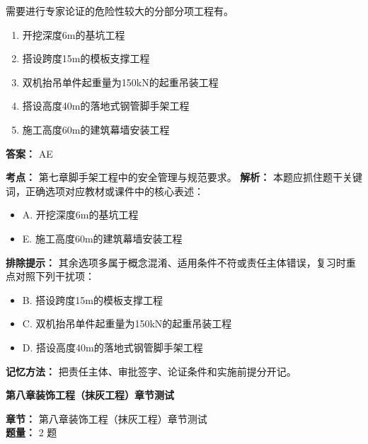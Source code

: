 \documentclass[UTF8,fontset=fandol,11pt]{ctexart}
\newcommand{\chaptertitle}[1]{\vspace{0.5em}\begin{tcolorbox}[enhanced,colback=deepblue,colframe=deepblue,arc=2mm,boxrule=0pt]\begin{center}\Large\bfseries\color{white}#1\end{center}\end{tcolorbox}\vspace{0.5em}}
\begin{document}
\begin{quizbox}[title={第 10 题}]
需要进行专家论证的危险性较大的分部分项工程有。\\
\begin{enumerate}[label=\Alph*.]
\item 开挖深度6m的基坑工程
\item 搭设跨度15m的模板支撑工程
\item 双机抬吊单件起重量为150kN的起重吊装工程
\item 搭设高度40m的落地式钢管脚手架工程
\item 施工高度60m的建筑幕墙安装工程
\end{enumerate}
\textbf{答案：} AE
\vspace{0.25em}
\begin{answerbox}[title={考点解析}]
\textbf{考点：} 第七章脚手架工程中的安全管理与规范要求。
\textbf{解析：} 本题应抓住题干关键词，正确选项对应教材或课件中的核心表述：
\begin{itemize}
\item A. 开挖深度6m的基坑工程
\item E. 施工高度60m的建筑幕墙安装工程
\end{itemize}
\textbf{排除提示：} 其余选项多属于概念混淆、适用条件不符或责任主体错误，复习时重点对照下列干扰项：
\begin{itemize}
\item B. 搭设跨度15m的模板支撑工程
\item C. 双机抬吊单件起重量为150kN的起重吊装工程
\item D. 搭设高度40m的落地式钢管脚手架工程
\end{itemize}
\textbf{记忆方法：} 把责任主体、审批签字、论证条件和实施前提分开记。
\end{answerbox}
\end{quizbox}

\chaptertitle{第八章装饰工程（抹灰工程）章节测试}
\begin{mainbox}
\textbf{\textcolor{mainblue}{章节：}} 第八章装饰工程（抹灰工程）章节测试\\
\textbf{\textcolor{answerred}{题量：}} 2 题
\end{mainbox}
\end{document}
